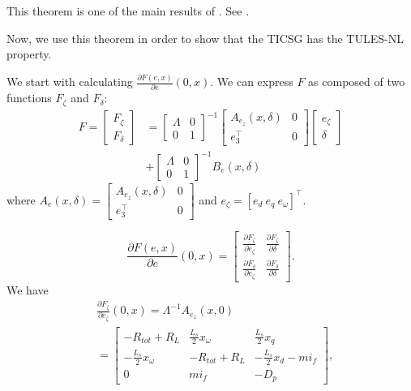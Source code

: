 \documentclass[letterpaper, 10 pt, conference]{ieeeconf}
\begin{document}
This theorem is one of the main results of \cite{AndrieuJayawardhanaPraly}. See \cite[Comment 2, p.3]{AndrieuJayawardhanaPraly}.

Now, we use this theorem in order to show that the TICSG has the TULES-NL property.

We start with calculating $\frac{\partial F(e,x)}{\partial e}(0,x)$. We can express $F$ as composed of two functions $F_\zeta$ and $F_\delta$:
$$
\begin{aligned}
 F = \left[\begin{array}{cc} F_\zeta \\ F_\delta \end{array}\right] &= \left[\begin{array}{cc}
\varLambda & 0\\
0 & 1
\end{array}\right]^{-1} \left[\begin{array}{cc}
A_{e_z}(x,\delta) & 0\\
e_3^\top & 0
\end{array}\right]   \left[\begin{array}{cc} e_\zeta \\ \delta \end{array}\right]    \\ &+ \left[\begin{array}{cc}
\varLambda & 0\\
0 & 1
\end{array}\right]^{-1}B_e\left(x,\delta\right)
\end{aligned}
$$
where $A_e(x,\delta) = \left[\begin{array}{cc}
A_{e_z}(x,\delta) & 0\\
e_3^\top & 0
\end{array}\right] $ and $e_\zeta = \left[e_d \ e_q \ e_\omega \right]^\top$.

$$
\frac{\partial F(e,x)}{\partial e}(0,x)=\left[\begin{array}{cccc}
 \frac{\partial F_\zeta}{\partial e_\zeta} & \frac{\partial F_\zeta}{\partial \delta} \\
\frac{\partial F_\delta}{\partial e_\zeta}  & \frac{\partial F_\delta}{\partial \delta}

\end{array}\right].
$$
We have 
$$
\begin{aligned}
&\frac{\partial F_\zeta}{\partial e_\zeta}(0,x)=\varLambda^{-1}A_{e_z}(x,0) \\&=\left[\begin{array}{ccc}
-R_{tot}+R_{L} & \frac{L_{s}}{2}x_{\omega} & \frac{L_{s}}{2}x_{q} \\
-\frac{L_{s}}{2}x_{\omega} & -R_{tot}+R_{L} & -\frac{L_{s}}{2}x_{d}-mi_f \\
0 & mi_{f} & -D_{p} 
\end{array}\right],
\end{aligned}
$$
\end{document}
